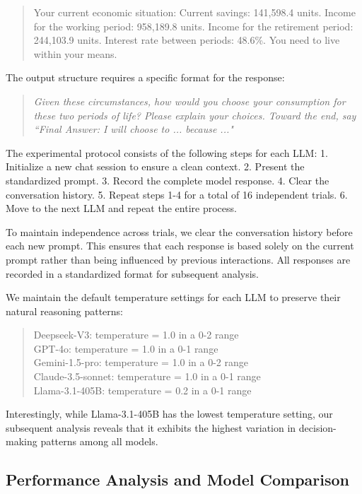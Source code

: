 \documentclass[12pt]{article}
\begin{document}
\begin{CJK*}{UTF8}{gbsn}
\begin{quote}
Your current economic situation: Current savings: 141,598.4 units. Income for the working period: 958,189.8 units. Income for the retirement period: 244,103.9 units. Interest rate between periods: 48.6\%. You need to live within your means.
\end{quote}

The output structure requires a specific format for the response:

\begin{quote}
\itshape 
Given these circumstances, how would you choose your consumption for these two periods of life? Please explain your choices. Toward the end, say ``Final Answer: I will choose to ... because ..."
\end{quote}

The experimental protocol consists of the following steps for each LLM:
1. Initialize a new chat session to ensure a clean context.
2. Present the standardized prompt. 
3. Record the complete model response.
4. Clear the conversation history.
5. Repeat steps 1-4 for a total of 16 independent trials.
6. Move to the next LLM and repeat the entire process.

To maintain independence across trials, we clear the conversation history before each new prompt. This ensures that each response is based solely on the current prompt rather than being influenced by previous interactions. All responses are recorded in a standardized format for subsequent analysis.

We maintain the default temperature settings for each LLM to preserve their natural reasoning patterns:
\begin{quote}
Deepseek-V3: temperature = 1.0 in a 0-2 range\\
GPT-4o: temperature = 1.0 in a 0-1 range\\
Gemini-1.5-pro: temperature = 1.0 in a 0-2 range\\
Claude-3.5-sonnet: temperature = 1.0 in a 0-1 range\\
Llama-3.1-405B: temperature = 0.2 in a 0-1 range
\end{quote}
Interestingly, while Llama-3.1-405B has the lowest temperature setting, our subsequent analysis reveals that it exhibits the highest variation in decision-making patterns among all models.

\subsection{Performance Analysis and Model Comparison}




\end{CJK*}
\end{document}
